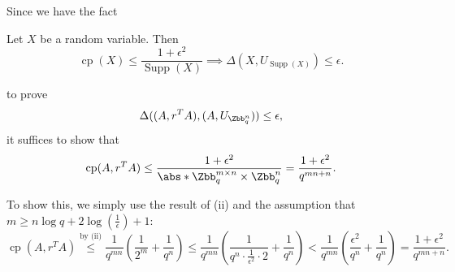 \begin{answer}[iii]
    Since we have the fact
    \begin{lemma}[Fact]\label{fact}
        Let $X$ be a random variable. Then
        \[ 
            \mathop{\textrm{cp}}(X) \le \frac{1+\epsilon^2}{\mathop{\textrm{Supp}}(X)}
            \implies \Delta(X, U_{\mathop{\textrm{Supp}}(X)}) \le \epsilon.
        \]
    \end{lemma}
    \noindent to prove
    \[
        \Delta((A,r^TA), (A,U_{\Zbb_q^n})) \le \epsilon,
    \]
    it suffices to show that
    \[
        \mathop{\textrm{cp}}(A, r^TA) \le \frac{1+\epsilon^2}{\abs*{\Zbb_q^{m\times n}\times \Zbb_q^n}} = \frac{1+\epsilon^2}{q^{mn+n}}.
    \]

    To show this, we simply use the result of (ii) and the assumption that $m\ge n\log q+2\log(\frac{1}{\epsilon})+1$:
    \[
        \mathop{\textrm{cp}}(A, r^TA)
        \stackrel{\textrm{by (ii)}}\le \frac{1}{q^{mn}} \left( \frac{1}{2^m}+\frac{1}{q^n} \right)
        \le \frac{1}{q^{mn}} \left( \frac{1}{q^n\cdot \frac{1}{\epsilon^2}\cdot 2}+\frac{1}{q^n} \right)
        \lt  \frac{1}{q^{mn}} \left( \frac{\epsilon^2}{q^n}+\frac{1}{q^n} \right)
        =  \frac{1+\epsilon^2}{q^{mn+n}}.
    \]
\end{answer}



